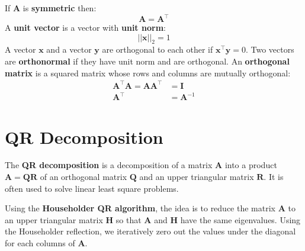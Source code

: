 \documentclass[12pt]{report}
\begin{document}
        If $\boldsymbol{A}$ is \textbf{symmetric} then:
        \begin{equation}
            \boldsymbol{A} = \boldsymbol{A}^\top
        \end{equation}
        A \textbf{unit vector} is a vector with \textbf{unit norm}:
        \begin{equation}
            ||\boldsymbol{x}||_2 = 1
        \end{equation}
        A vector $\boldsymbol{x}$ and a vector $\boldsymbol{y}$ are orthogonal to each other if $\boldsymbol{x}^\top \boldsymbol{y} = 0$.
        Two vectors are \textbf{orthonormal} if they have unit norm and are orthogonal.
        \newpage
        An \textbf{orthogonal matrix} is a squared matrix whose rows and columns are mutually orthogonal:
        \begin{align}
            \boldsymbol{A}^\top \boldsymbol{A} = \boldsymbol{A}\boldsymbol{A}^\top &= \boldsymbol{I} \\
            \boldsymbol{A}^\top &= \boldsymbol{A}^{-1}
        \end{align}

    \section{QR Decomposition}
        The \textbf{QR decomposition} is a decomposition of a matrix $\boldsymbol{A}$ into a product $\boldsymbol{A} = \boldsymbol{Q}\boldsymbol{R}$ of an orthogonal matrix $\boldsymbol{Q}$ and an upper triangular matrix $\boldsymbol{R}$. It is often used to solve linear least square problems.
    
        Using the \textbf{Householder QR algorithm}, the idea is to reduce the matrix   $\boldsymbol{A}$ to an upper triangular matrix $\boldsymbol{H}$ so that $\boldsymbol{A}$ and $\boldsymbol{H}$ have the same eigenvalues. Using the Householder reflection, we iteratively zero out the values under the diagonal for each columns of  $\boldsymbol{A}$.
        
\end{document}
